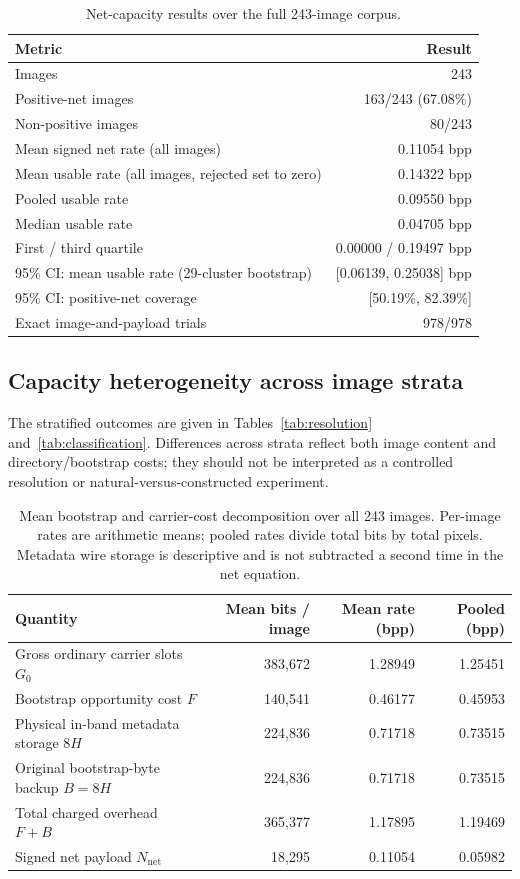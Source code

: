 \documentclass[preprint,12pt,a4paper]{elsarticle}
\begin{document}
\begin{table}[t]
\centering
\caption{Net-capacity results over the full 243-image corpus.}
\label{tab:capacity}
\small
\begin{tabular}{lr}
\toprule
Metric & Result\\
\midrule
Images & 243\\
Positive-net images & 163/243 (67.08\%)\\
Non-positive images & 80/243\\
Mean signed net rate (all images) & 0.11054 bpp\\
Mean usable rate (all images, rejected set to zero) & 0.14322 bpp\\
Pooled usable rate & 0.09550 bpp\\
Median usable rate & 0.04705 bpp\\
First / third quartile & 0.00000 / 0.19497 bpp\\
95\% CI: mean usable rate (29-cluster bootstrap) & [0.06139, 0.25038] bpp\\
95\% CI: positive-net coverage & [50.19\%, 82.39\%]\\
Exact image-and-payload trials & 978/978\\
\bottomrule
\end{tabular}
\end{table}

\subsection{Capacity heterogeneity across image strata}

The stratified outcomes are given in Tables~\ref{tab:resolution} and~\ref{tab:classification}. Differences across strata reflect both image content and directory/bootstrap costs; they should not be interpreted as a controlled resolution or natural-versus-constructed experiment.


\begin{table}[t]
\centering
\caption{Mean bootstrap and carrier-cost decomposition over all 243 images. Per-image rates are arithmetic means; pooled rates divide total bits by total pixels. Metadata wire storage is descriptive and is not subtracted a second time in the net equation.}
\label{tab:overhead}
\scriptsize
\begin{tabularx}{\textwidth}{Xrrr}
\toprule
Quantity & Mean bits / image & Mean rate (bpp) & Pooled (bpp)\\
\midrule
Gross ordinary carrier slots $G_0$ & 383,672 & 1.28949 & 1.25451\\
Bootstrap opportunity cost $F$ & 140,541 & 0.46177 & 0.45953\\
Physical in-band metadata storage $8H$ & 224,836 & 0.71718 & 0.73515\\
Original bootstrap-byte backup $B=8H$ & 224,836 & 0.71718 & 0.73515\\
Total charged overhead $F+B$ & 365,377 & 1.17895 & 1.19469\\
\midrule
Signed net payload $N_{\mathrm{net}}$ & 18,295 & 0.11054 & 0.05982\\
\bottomrule
\end{tabularx}
\end{table}
\end{document}
